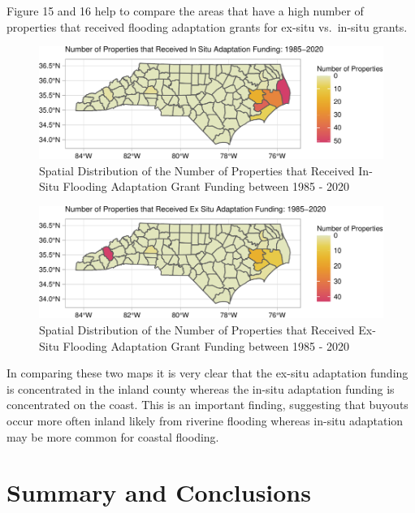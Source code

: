 \documentclass[
  12pt,
]{article}
\begin{document}
\newpage

Figure 15 and 16 help to compare the areas that have a high number of
properties that received flooding adaptation grants for ex-situ
vs.~in-situ grants.

\begin{figure}
\centering
\includegraphics{finalreport_files/figure-latex/unnamed-chunk-27-1.pdf}
\caption{Spatial Distribution of the Number of Properties that Received
In-Situ Flooding Adaptation Grant Funding between 1985 - 2020}
\end{figure}

\begin{figure}
\centering
\includegraphics{finalreport_files/figure-latex/unnamed-chunk-28-1.pdf}
\caption{Spatial Distribution of the Number of Properties that Received
Ex-Situ Flooding Adaptation Grant Funding between 1985 - 2020}
\end{figure}

In comparing these two maps it is very clear that the ex-situ adaptation
funding is concentrated in the inland county whereas the in-situ
adaptation funding is concentrated on the coast. This is an important
finding, suggesting that buyouts occur more often inland likely from
riverine flooding whereas in-situ adaptation may be more common for
coastal flooding.

\newpage

\hypertarget{summary-and-conclusions}{%
\section{Summary and Conclusions}\label{summary-and-conclusions}}
\end{document}
